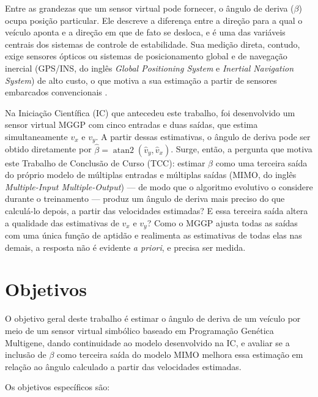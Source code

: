 Entre as grandezas que um sensor virtual pode fornecer, o ângulo de deriva ($\beta$) ocupa posição particular. Ele descreve a diferença entre a direção para a qual o veículo aponta e a direção em que de fato se desloca, e é uma das variáveis centrais dos sistemas de controle de estabilidade. Sua medição direta, contudo, exige sensores ópticos ou sistemas de posicionamento global e de navegação inercial (GPS/INS, do inglês \textit{Global Positioning System} e \textit{Inertial Navigation System}) de alto custo, o que motiva a sua estimação a partir de sensores embarcados convencionais \cite{chindamo2018, liu2018}.

Na Iniciação Científica (IC) que antecedeu este trabalho, foi desenvolvido um sensor virtual MGGP com cinco entradas e duas saídas, que estima simultaneamente $v_x$ e $v_y$. A partir dessas estimativas, o ângulo de deriva pode ser obtido diretamente por $\hat\beta = \operatorname{atan2}(\hat v_y, \hat v_x)$. Surge, então, a pergunta que motiva este Trabalho de Conclusão de Curso (TCC): estimar $\beta$ como uma terceira saída do próprio modelo de múltiplas entradas e múltiplas saídas (MIMO, do inglês \textit{Multiple-Input Multiple-Output}) --- de modo que o algoritmo evolutivo o considere durante o treinamento --- produz um ângulo de deriva mais preciso do que calculá-lo depois, a partir das velocidades estimadas? E essa terceira saída altera a qualidade das estimativas de $v_x$ e $v_y$? Como o MGGP ajusta todas as saídas com uma única função de aptidão e realimenta as estimativas de todas elas nas demais, a resposta não é evidente \emph{a priori}, e precisa ser medida.

\section{Objetivos}

O objetivo geral deste trabalho é estimar o ângulo de deriva de um veículo por meio de um sensor virtual simbólico baseado em Programação Genética Multigene, dando continuidade ao modelo desenvolvido na IC, e avaliar se a inclusão de $\beta$ como terceira saída do modelo MIMO melhora essa estimação em relação ao ângulo calculado a partir das velocidades estimadas.

Os objetivos específicos são:

